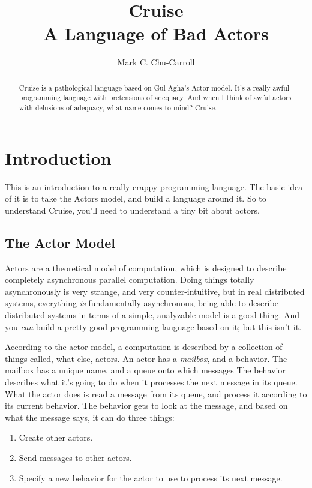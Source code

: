 \documentclass[11pt]{article}
\title{Cruise \\ A Language of Bad Actors}
\author{Mark C. Chu-Carroll}
\begin{document}
\maketitle

\begin{abstract}
Cruise is a pathological language based on Gul Agha's Actor model. It's a really awful
programming language with pretensions of adequacy. And when I think of awful actors
with delusions of adequacy, what name comes to mind? Cruise.
\end{abstract}

\section{Introduction}

This is an introduction to a really crappy programming language. The basic idea of it is to
take the Actors model, and build a language around it. So to understand Cruise, you'll need to understand a tiny bit about actors.

\subsection{The Actor Model}

Actors are a theoretical model of computation, which is designed to describe completely
asynchronous parallel computation. Doing things totally asynchronously is very strange, and very counter-intuitive, but in real distributed systems, everything {\em is} fundamentally asynchronous, being able to describe distributed systems in terms of a simple, analyzable model is a good thing. And you {\em can} build a pretty good programming language based on it; but this isn't it.

According to the actor model, a computation is described by a collection of things called, what else, actors. An actor has a {\em mailbox}, and a behavior. The mailbox has a unique name, and a  queue onto which messages  The behavior describes what it's going to do when it processes the next message in its queue. What the actor does is read a message from its queue, and process it according to its current behavior. The behavior gets to look at the message, and based on what the message says, it can do three things:

\begin{enumerate}
\item Create other actors.
\item Send messages to other actors.
\item Specify a new behavior for the actor to use to process its next message.
\end{enumerate}
\end{document}
